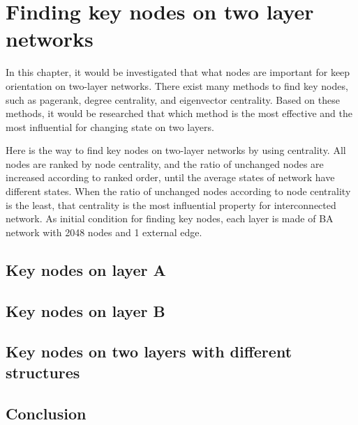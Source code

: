 
\chapter{Finding key nodes on two layer networks}
\label{chap:finding key nodes on two layer networks}
In this chapter, it would be investigated that what nodes are important for keep orientation on two-layer networks. There exist many methods to find key nodes, such as pagerank, degree centrality, and eigenvector centrality. Based on these methods, it would be researched that which method is the most effective and the most influential for changing state on two layers.  

Here is the way to find key nodes on two-layer networks by using centrality. All nodes are ranked by node centrality, and the ratio of unchanged nodes are increased according to ranked order, until the average states of network have different states. 
When the ratio of unchanged nodes according to node centrality is the least, that centrality is the most influential property for interconnected network.
As initial condition for finding key nodes, each layer is made of BA network with 2048 nodes and 1 external edge. 

\section{Key nodes on layer A}



\section{Key nodes on layer B}



\section{Key nodes on two layers with different structures}

\section{Conclusion}
